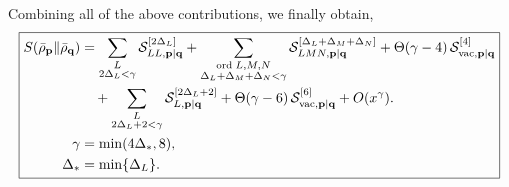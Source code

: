 \documentclass[11pt]{article}
\newcommand{\nn}{\nonumber}
\newcommand{\lb}{\left(}
\newcommand{\rb}{\right)}
\begin{document}
Combining all of the above contributions, we finally obtain,
\begin{align}
\boxed{
\begin{aligned}
S(\bar\rho_{\mathbf p}\|\bar\rho_{\mathbf q})
&=
\sum_{\substack{L\\2\Delta_L<\gamma}}
\mathcal S_{LL,\mathbf p|\mathbf q}^{[2\Delta_L]}
+
\sum_{\substack{{\rm ord}\;L,M,N\\
\Delta_L+\Delta_M+\Delta_N<\gamma}}
\mathcal S_{LMN,\mathbf p|\mathbf q}^{[\Delta_L+\Delta_M+\Delta_N]}
+
\Theta(\gamma-4)\,
\mathcal S_{{\rm vac},\mathbf p|\mathbf q}^{[4]}
\nn\\
&\quad+
\sum_{\substack{L\\2\Delta_L+2<\gamma}}
\mathcal S_{L,\mathbf p|\mathbf q}^{[2\Delta_L+2]}
+
\Theta(\gamma-6)\,
\mathcal S_{{\rm vac},\mathbf p|\mathbf q}^{[6]}
+
O(x^\gamma).
\\
\gamma &= \min(4\Delta_*,8),
\\
\Delta_* &= \min\{\Delta_L\}.
\end{aligned}}
\end{align}



\end{document}
